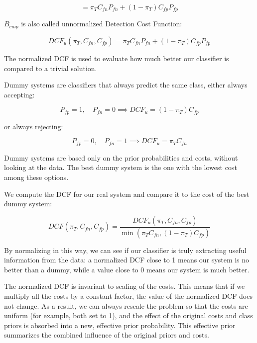 \begin{equation*}
= \pi_T C_{fn} P_{fn} + (1-\pi_T) C_{fp} P_{fp}
\end{equation*}

$B_{emp}$ is also called unnormalized Detection Cost Function:

\begin{equation*}
DCF_u(\pi_T, C_{fn}, C_{fp}) = \pi_T C_{fn} P_{fn} + (1-\pi_T) C_{fp} P_{fp}
\end{equation*}

The normalized DCF is used to evaluate how much better our classifier is compared to a trivial solution.

Dummy systems are classifiers that always predict the same class, either always accepting:

\begin{equation*}
P_{fp} = 1, \quad P_{fn} = 0 \implies DCF_u = (1-\pi_T)C_{fp}
\end{equation*}

or always rejecting:

\begin{equation*}
P_{fp} = 0, \quad P_{fn} = 1 \implies DCF_u = \pi_T C_{fn}
\end{equation*}

Dummy systems are based only on the prior probabilities and costs, without looking at the data. The best dummy system is the one with the lowest cost among these options.

We compute the DCF for our real system and compare it to the cost of the best dummy system:

\begin{equation*}
DCF(\pi_T, C_{fn}, C_{fp}) = \frac{DCF_u(\pi_T, C_{fn}, C_{fp})}{\min(\pi_T C_{fn}, (1-\pi_T)C_{fp})}
\end{equation*}

By normalizing in this way, we can see if our classifier is truly extracting useful information from the data: a normalized DCF close to 1 means our system is no better than a dummy, while a value close to 0 means our system is much better.

The normalized DCF is invariant to scaling of the costs. This means that if we multiply all the costs by a constant factor, the value of the normalized DCF does not change. As a result, we can always rescale the problem so that the costs are uniform (for example, both set to 1), and the effect of the original costs and class priors is absorbed into a new, effective prior probability. This effective prior summarizes the combined influence of the original priors and costs.

